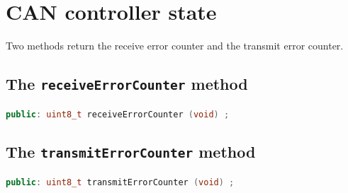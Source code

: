 \documentclass[9pt, a4paper, obeyspaces]{extarticle}
\newcommand \sectionLabel[2]{\section{#1}\label{sec:#2}}
\begin{document}
\sectionLabel{CAN controller state}{canControllerState}

Two methods return the receive error counter and the transmit error counter.



\subsection{The \texttt{receiveErrorCounter} method}

{ \small\begin{lstlisting}[language=c++]
public: uint8_t receiveErrorCounter (void) ;
\end{lstlisting}}



\subsection{The \texttt{transmitErrorCounter} method}

{ \small\begin{lstlisting}[language=c++]
public: uint8_t transmitErrorCounter (void) ;
\end{lstlisting}}


\end{document}

